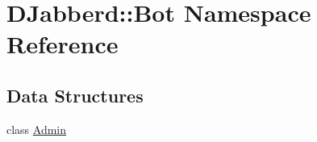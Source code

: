 \hypertarget{namespace_d_jabberd_1_1_bot}{
\section{\-D\-Jabberd\-:\-:\-Bot \-Namespace \-Reference}
\label{namespace_d_jabberd_1_1_bot}
}
\subsection*{\-Data \-Structures}
\begin{DoxyCompactItemize}
\item 
class \hyperlink{class_d_jabberd_1_1_bot_1_1_admin}{\-Admin}
\end{DoxyCompactItemize}
